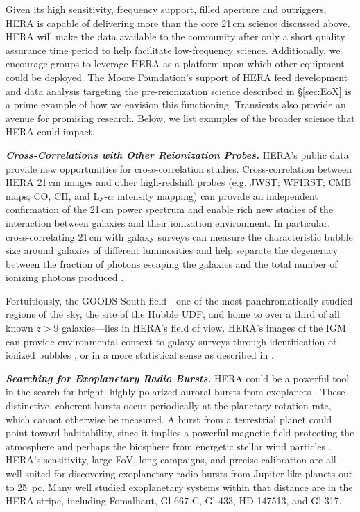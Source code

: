 \documentclass[preprint,11pt]{aastex}
\begin{document}
\noindent Given its high sensitivity, frequency support, filled aperture and outriggers, HERA is capable of delivering more than the core 21\,cm science discussed above.
HERA will make the data available to the community after only a short quality assurance time period to help facilitate low-frequency science.
Additionally, we encourage groups to leverage HERA as a platform upon which other equipment could be deployed. 
The Moore Foundation's support of HERA feed development and data analysis targeting the pre-reionization science described in \S\ref{sec:EoX}
is a prime example of how we envision this functioning.  Transients also provide an avenue for promising research.
Below, we list examples of the broader science that HERA could impact.

\emph{\textbf{Cross-Correlations with Other Reionization Probes.}}
\label{sec:crossCorr}
HERA's public data provide new opportunities for cross-correlation studies.
Cross-correlation between HERA 21\,cm images and other high-redshift probes
(e.g. JWST; WFIRST; CMB maps; CO, CII, and Ly-$\alpha$ intensity mapping) 
can provide an independent confirmation of the 21\,cm power spectrum
\citep[i.e.][]{lidz_et_al2009,dore_et_al2014,silva_et_al2015,vrbanec2016} and enable rich new studies of
the interaction between galaxies and their ionization environment. 
In particular, cross-correlating 21\,cm with galaxy surveys can measure the characteristic bubble size around galaxies of
different luminosities \citep{lidz_et_al2009} and help separate the degeneracy
between the fraction of photons escaping the galaxies and the
total number of ionizing photons produced \citep{zackrisson2013}.

Fortuitiously, the GOODS-South field---one of the most panchromatically studied regions of the sky, the site of the Hubble UDF, and home to over a third of all known $z>9$
galaxies---lies in HERA's field of view. HERA's images of the IGM can provide environmental context to galaxy surveys through identification of
ionized bubbles \citep{malloy_lidz2013}, or in a more statistical sense as
described in \cite{beardsley_et_al2015}.

\textbf{\emph{Searching for Exoplanetary Radio Bursts.}}
\label{sec:exoplanets}
HERA could be a powerful tool in the search for bright, highly polarized auroral bursts
from exoplanets %
\citep{treumann2006,hallinan_et_al2015}. These
distinctive, coherent bursts occur periodically at the planetary
rotation rate, which cannot otherwise be measured. 
A burst from a terrestrial planet could point toward
habitability, since it implies a powerful magnetic field
protecting the atmosphere and perhaps the biosphere from energetic stellar wind
particles \citep{tarter_et_al2007}. HERA's sensitivity, large FoV, long campaigns, and precise calibration are all well-suited
for discovering exoplanetary radio bursts from Jupiter-like planets out to 25~pc. Many well studied exoplanetary systems within that distance are in the HERA stripe, including Fomalhaut, Gl 667 C, Gl 433, HD 147513, and Gl 317.
\end{document}
